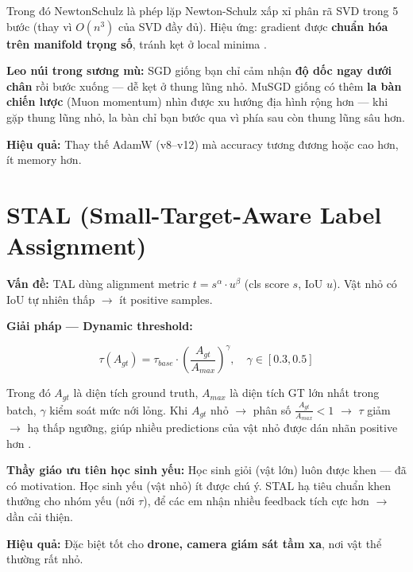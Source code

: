 \documentclass[12pt,a4paper]{report}
\begin{document}
Trong đó $\mathrm{NewtonSchulz}$ là phép lặp Newton-Schulz xấp xỉ phân rã SVD trong 5 bước (thay vì $O(n^3)$ của SVD đầy đủ). Hiệu ứng: gradient được \textbf{chuẩn hóa trên manifold trọng số}, tránh kẹt ở local minima \cite{yolo26}.

\begin{analogybox}
\textbf{Leo núi trong sương mù:} SGD giống bạn chỉ cảm nhận \textbf{độ dốc ngay dưới chân} rồi bước xuống --- dễ kẹt ở thung lũng nhỏ. MuSGD giống có thêm \textbf{la bàn chiến lược} (Muon momentum) nhìn được xu hướng địa hình rộng hơn --- khi gặp thung lũng nhỏ, la bàn chỉ bạn bước qua vì phía sau còn thung lũng sâu hơn.
\end{analogybox}

\textbf{Hiệu quả:} Thay thế AdamW (v8--v12) mà accuracy tương đương hoặc cao hơn, ít memory hơn.

\section{STAL (Small-Target-Aware Label Assignment)}

\textbf{Vấn đề:} TAL \cite{ppyoloe} dùng alignment metric $t = s^\alpha \cdot u^\beta$ (cls score $s$, IoU $u$). Vật nhỏ có IoU tự nhiên thấp $\rightarrow$ ít positive samples.

\textbf{Giải pháp --- Dynamic threshold:}

\begin{equation}
\tau(A_{gt}) = \tau_{base} \cdot \left(\frac{A_{gt}}{A_{max}}\right)^{\gamma}, \quad \gamma \in [0.3, 0.5]
\end{equation}

Trong đó $A_{gt}$ là diện tích ground truth, $A_{max}$ là diện tích GT lớn nhất trong batch, $\gamma$ kiểm soát mức nới lỏng. Khi $A_{gt}$ nhỏ $\rightarrow$ phân số $\frac{A_{gt}}{A_{max}} < 1$ $\rightarrow$ $\tau$ giảm $\rightarrow$ hạ thấp ngưỡng, giúp nhiều predictions của vật nhỏ được dán nhãn positive hơn \cite{yolo26}.

\begin{analogybox}
\textbf{Thầy giáo ưu tiên học sinh yếu:} Học sinh giỏi (vật lớn) luôn được khen --- đã có motivation. Học sinh yếu (vật nhỏ) ít được chú ý. STAL hạ tiêu chuẩn khen thưởng cho nhóm yếu (nới $\tau$), để các em nhận nhiều feedback tích cực hơn $\rightarrow$ dần cải thiện.
\end{analogybox}

\textbf{Hiệu quả:} Đặc biệt tốt cho \textbf{drone, camera giám sát tầm xa}, nơi vật thể thường rất nhỏ.
\end{document}

